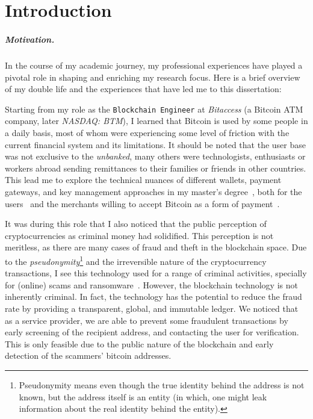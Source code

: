 

\chapter{Introduction} \label{sec:intro}



\paragraph{Motivation.} In the course of my academic journey, my professional experiences have played a pivotal role in shaping and enriching my research focus. Here is a brief overview of my double life and the experiences that have led me to this dissertation: %

Starting from my role as the \texttt{Blockchain Engineer} at \textit{Bitaccess} (a Bitcoin ATM company, later \textit{NASDAQ: BTM}), I learned that Bitcoin is used by some people in a daily basis, most of whom were experiencing some level of friction with the current financial system and its limitations. It should be noted that the user base was not exclusive to the \textit{unbanked}, many others were technologists, enthusiasts or workers abroad sending remittances to their families or friends in other countries. This lead me to explore the technical nuances of different wallets, payment gateways, and key management approaches in my master’s degree~\cite{eskandari2015real}, both for the users~\cite{EBSC15} and the merchants willing to accept Bitcoin as a form of payment~\cite{eskandari2016buy}.

It was during this role that I also noticed that the public perception of cryptocurrencies as criminal money had solidified. This perception is not meritless, as there are many cases of fraud and theft in the blockchain space. Due to the \textit{pseudonymity}\footnote{Pseudonymity means even though the true identity behind the address is not known, but the address itself is an entity (in which, one might leak information about the real identity behind the entity).} and the irreversible nature of the cryptocurrency transactions, I see this technology used for a range of criminal activities, specially for (online) scams and ransomware~\cite{paquet2019ransomware,conti2018economic}. However, the blockchain technology is not inherently criminal. In fact, the technology has the potential to reduce the fraud rate by providing a transparent, global, and immutable ledger. We noticed that as a service provider, we are able to prevent some fraudulent transactions by early screening of the recipient address, and contacting the user for verification. This is only feasible due to the public nature of the blockchain and early detection of the scammers' bitcoin addresses.

